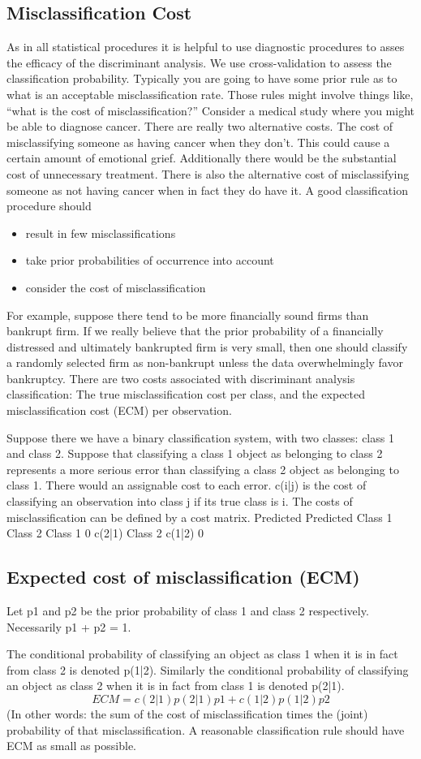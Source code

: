 \documentclass[12pt]{article}
\begin{document}
\subsection*{Misclassification Cost}
As in all statistical procedures it is helpful to use diagnostic procedures to
asses the efficacy of the discriminant analysis. We use cross-validation to
assess the classification probability. Typically you are going to have some
prior rule as to what is an acceptable misclassification rate.
Those rules might involve things like, “what is the cost of misclassification?”
Consider a medical study where you might be able to diagnose cancer.
There are really two alternative costs. The cost of misclassifying someone
as having cancer when they don’t. This could cause a certain amount of emotional
grief. Additionally there would be the substantial cost of unnecessary
treatment.
There is also the alternative cost of misclassifying someone as not having
cancer when in fact they do have it.
A good classification procedure should
\begin{itemize}
	\item result in few misclassifications
	\item take prior probabilities of occurrence into account
	\item consider the cost of misclassification
\end{itemize}
For example, suppose there tend to be more financially sound firms than
bankrupt firm. If we really believe that the prior probability of a financially
distressed and ultimately bankrupted firm is very small, then one should classify
a randomly selected firm as non-bankrupt unless the data overwhelmingly
favor bankruptcy.
There are two costs associated with discriminant analysis classification:
The true misclassification cost per class, and the expected misclassification
cost (ECM) per observation.

\smallskip

Suppose there we have a binary classification system, with two classes:
class 1 and class 2. Suppose that classifying a class 1 object as belonging
to class 2 represents a more serious error than classifying a class 2 object as
belonging to class 1. There would an assignable cost to each error. c(i|j) is
the cost of classifying an observation into class j if its true class is i. The
costs of misclassification can be defined by a cost matrix.
Predicted Predicted
Class 1 Class 2
Class 1 0 c(2|1)
Class 2 c(1|2) 0
\subsection*{ Expected cost of misclassification (ECM)}
Let p1 and p2 be the prior probability of class 1 and class 2 respectively.
Necessarily p1 + p2 = 1.

The conditional probability of classifying an object as class 1 when it is
in fact from class 2 is denoted p(1|2). Similarly the conditional probability
of classifying an object as class 2 when it is in fact from class 1 is denoted
p(2|1).
\[ ECM = c(2|1)p(2|1)p1 + c(1|2)p(1|2)p2\]
(In other words: the sum of the cost of misclassification times the (joint)
probability of that misclassification.
A reasonable classification rule should have ECM as small as possible.
\end{document}
